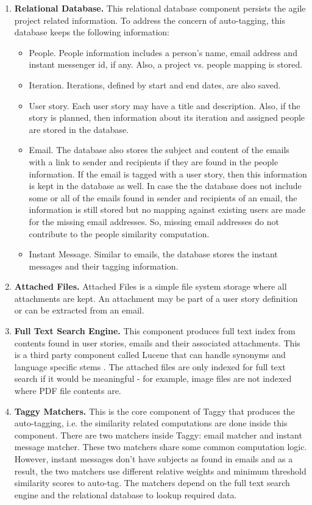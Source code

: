 \begin{enumerate}
	\item \textbf{Relational Database.} This relational database component persists the agile project related information. To address the concern of auto-tagging, this database keeps the following information:
		\begin{itemize}
			\item People. People information includes a person's name, email address and instant messenger id, if any. Also, a project vs. people mapping is stored.
			\item Iteration. Iterations, defined by start and end dates, are also saved.
			\item User story. Each user story may have a title and description. Also, if the story is planned, then information about its iteration and assigned people are stored in the database.
			\item Email. The database also stores the subject and content of the emails with a link to sender and recipients if they are found in the people information. If the email is tagged with a user story, then this information is kept in the database as well. In case the the database does not include some or all of the emails found in sender and recipients of an email, the information is still stored but no mapping against existing users are made for the missing email addresses. So, missing email addresses do not contribute to the people similarity computation.
			\item Instant Message. Similar to emails, the database stores the instant messages and their tagging information.
		\end{itemize}

	 \item \textbf{Attached Files.} Attached Files is a simple file system storage where all attachments are kept. An attachment may be part of a user story definition or can be extracted from an email.
	
	 \item \textbf{Full Text Search Engine.} This component produces full text index from contents found in user stories, emails and their associated attachments. This is a third party component called Lucene that can handle synonyms and language specific stems \cite{lucene}. The attached files are only indexed for full text search if it would be meaningful - for example, image files are not indexed where PDF file contents are.
	
	\item \textbf{Taggy Matchers.} This is the core component of Taggy that produces the auto-tagging, i.e. the similarity related computations are done inside this component. There are two matchers inside Taggy: email matcher and instant message matcher. These two matchers share some common computation logic. However, instant messages don't have subjects as found in emails and as a result, the two matchers use different relative weights and minimum threshold similarity scores to auto-tag. The matchers depend on the full text search engine and the relational database to lookup required data.
	

\end{enumerate}
